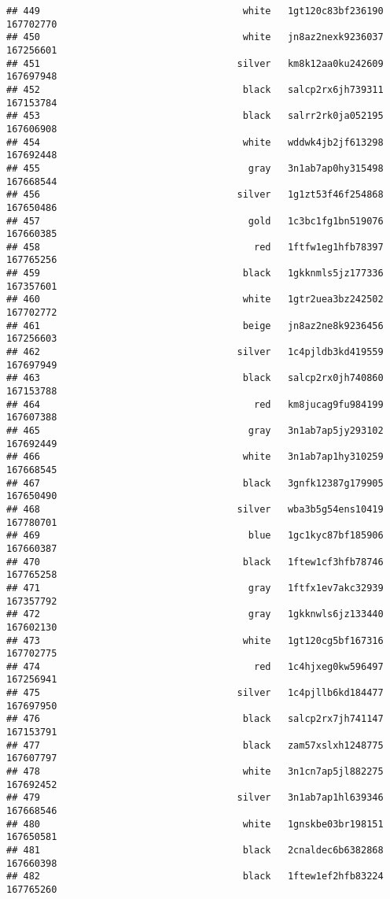 \documentclass[
]{article}
\begin{document}
\begin{verbatim}
## 449                                    white   1gt120c83bf236190 167702770
## 450                                    white   jn8az2nexk9236037 167256601
## 451                                   silver   km8k12aa0ku242609 167697948
## 452                                    black   salcp2rx6jh739311 167153784
## 453                                    black   salrr2rk0ja052195 167606908
## 454                                    white   wddwk4jb2jf613298 167692448
## 455                                     gray   3n1ab7ap0hy315498 167668544
## 456                                   silver   1g1zt53f46f254868 167650486
## 457                                     gold   1c3bc1fg1bn519076 167660385
## 458                                      red   1ftfw1eg1hfb78397 167765256
## 459                                    black   1gkknmls5jz177336 167357601
## 460                                    white   1gtr2uea3bz242502 167702772
## 461                                    beige   jn8az2ne8k9236456 167256603
## 462                                   silver   1c4pjldb3kd419559 167697949
## 463                                    black   salcp2rx0jh740860 167153788
## 464                                      red   km8jucag9fu984199 167607388
## 465                                     gray   3n1ab7ap5jy293102 167692449
## 466                                    white   3n1ab7ap1hy310259 167668545
## 467                                    black   3gnfk12387g179905 167650490
## 468                                   silver   wba3b5g54ens10419 167780701
## 469                                     blue   1gc1kyc87bf185906 167660387
## 470                                    black   1ftew1cf3hfb78746 167765258
## 471                                     gray   1ftfx1ev7akc32939 167357792
## 472                                     gray   1gkknwls6jz133440 167602130
## 473                                    white   1gt120cg5bf167316 167702775
## 474                                      red   1c4hjxeg0kw596497 167256941
## 475                                   silver   1c4pjllb6kd184477 167697950
## 476                                    black   salcp2rx7jh741147 167153791
## 477                                    black   zam57xslxh1248775 167607797
## 478                                    white   3n1cn7ap5jl882275 167692452
## 479                                   silver   3n1ab7ap1hl639346 167668546
## 480                                    white   1gnskbe03br198151 167650581
## 481                                    black   2cnaldec6b6382868 167660398
## 482                                    black   1ftew1ef2hfb83224 167765260

\end{verbatim}
\end{document}
